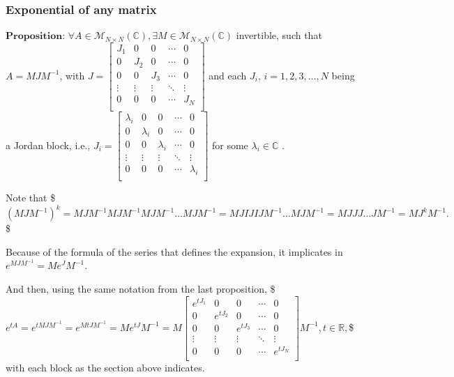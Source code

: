 \documentclass[letterpaper,10pt,english]{jupyterBook}
\begin{document}
\subsubsection{Exponential of any matrix}
\label{\detokenize{cap3:exponential-of-any-matrix}}
\sphinxAtStartPar
\(\textbf{Proposition: } \forall A \in \mathscr{M}_{N \times N}(\mathbb{C}), \exists M \in \mathscr{M}_{N \times N}(\mathbb{C})\) invertible, such that \(A = MJM^{-1}\), with \( J = \left[ {\begin{array}{ccccc}
    J_1 & 0 & 0 & \dotsm & 0\\
    0 & J_2 & 0 & \dotsm & 0\\
    0 & 0 & J_3 & \dotsm & 0\\
    \vdots & \vdots & \vdots & \ddots & \vdots\\
    0 & 0 & 0 & \dotsm & J_{N}\\
\end{array} } \right] \) and each \(J_i\), \(i = 1, 2, 3, \dotsc, N\) being a Jordan block, i.e., \(J_i = \left[ {\begin{array}{ccccc}
    \lambda_i & 0 & 0 & \dotsm & 0\\
    0 & \lambda_i & 0 & \dotsm & 0\\
    0 & 0 & \lambda_i & \dotsm & 0\\
    \vdots & \vdots & \vdots & \ddots & \vdots\\
    0 & 0 & 0 & \dotsm & \lambda_i\\
\end{array} } \right]\) for some \(\lambda_i \in \mathbb{C}\) .

\sphinxAtStartPar
Note that
\$\(
    (MJM^{-1})^k = MJM^{-1}MJM^{-1}MJM^{-1} \dotsc MJM^{-1} = MJIJIJM^{-1} \dotsc MJM^{-1} = MJJJ \dotsc JM^{-1} = MJ^kM^{-1}.
\)\$

\sphinxAtStartPar
Because of the formula of the series that defines the expansion, it implicates in \(e^{MJM^{-1}} = M e^J M^{-1}\).

\sphinxAtStartPar
And then, using the same notation from the last proposition,
\$\(
e^{tA} = e^{tMJM^{-1}} = e^{MtJM^{-1}} = Me^{tJ}M^{-1} = M \left[ { \begin{array}{ccccc}
        e^{tJ_1} & 0 & 0 & \dotsm & 0\\
        0 & e^{tJ_2} & 0 & \dotsm & 0\\
        0 & 0 & e^{tJ_3} & \dotsm & 0\\
        \vdots & \vdots & \vdots & \ddots & \vdots\\
        0 & 0 & 0 & \dotsm & e^{tJ_{N}}\\
    \end{array} } \right] M^{-1}, t \in \mathbb{R},
\)\$
with each block as the section above indicates.
\end{document}
